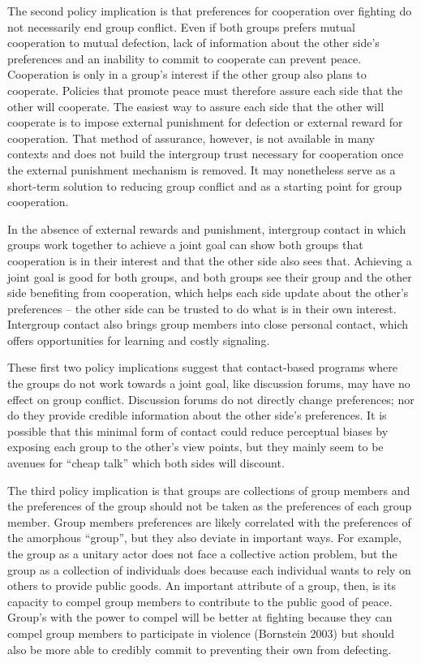 \documentclass[11pt]{article}
\begin{document}
The second policy implication is that preferences for cooperation over
fighting do not necessarily end group conflict. Even if both groups
prefers mutual cooperation to mutual defection, lack of information
about the other side's preferences and an inability to commit to
cooperate can prevent peace. Cooperation is only in a group's interest
if the other group also plans to cooperate. Policies that promote peace
must therefore assure each side that the other will cooperate. The
easiest way to assure each side that the other will cooperate is to
impose external punishment for defection or external reward for
cooperation. That method of assurance, however, is not available in many
contexts and does not build the intergroup trust necessary for
cooperation once the external punishment mechanism is removed. It may
nonetheless serve as a short-term solution to reducing group conflict
and as a starting point for group cooperation.

In the absence of external rewards and punishment, intergroup contact in
which groups work together to achieve a joint goal can show both groups
that cooperation is in their interest and that the other side also sees
that. Achieving a joint goal is good for both groups, and both groups
see their group and the other side benefiting from cooperation, which
helps each side update about the other's preferences -- the other side
can be trusted to do what is in their own interest. Intergroup contact
also brings group members into close personal contact, which offers
opportunities for learning and costly signaling.

These first two policy implications suggest that contact-based programs
where the groups do not work towards a joint goal, like discussion
forums, may have no effect on group conflict. Discussion forums do not
directly change preferences; nor do they provide credible information
about the other side's preferences. It is possible that this minimal
form of contact could reduce perceptual biases by exposing each group to
the other's view points, but they mainly seem to be avenues for ``cheap
talk'' which both sides will discount.

The third policy implication is that groups are collections of group
members and the preferences of the group should not be taken as the
preferences of each group member. Group members preferences are likely
correlated with the preferences of the amorphous ``group'', but they
also deviate in important ways. For example, the group as a unitary
actor does not face a collective action problem, but the group as a
collection of individuals does because each individual wants to rely on
others to provide public goods. An important attribute of a group, then,
is its capacity to compel group members to contribute to the public good
of peace. Group's with the power to compel will be better at fighting
because they can compel group members to participate in violence
(Bornstein 2003) but should also be more able to credibly commit to
preventing their own from defecting.
\end{document}
